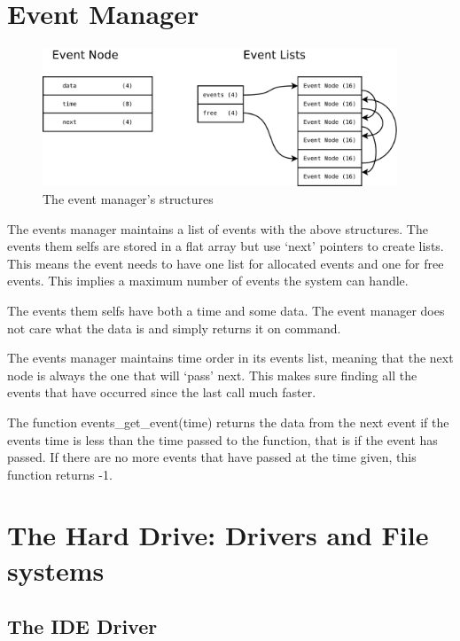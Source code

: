 \documentclass[a4paper]{report}
\begin{document}
\clearpage

\section{Event Manager}

\subsectoion


\begin{figure}[ht]
\centering
\includegraphics[width=400px]{images/Events_Structure}
\caption{The event manager's structures}
\label{fig:WinTitleBarScreen}
\end{figure}

The events manager maintains a list of events with the above structures. The events them selfs are stored in a flat array but use `next' pointers to create lists. This means the event needs to have one list for allocated events and one for free events. This implies a maximum number of events the system can handle.

The events them selfs have both a time and some data. The event manager does not care what the data is and simply returns it on command.

The events manager maintains time order in its events list, meaning that the next node is always the one that will `pass' next. This makes sure finding all the events that have occurred since the last call much faster.

The function events\_get\_event(time) returns the data from the next event if the events time is less than the time passed to the function, that is if the event has passed. If there are no more events that have passed at the time given, this function returns -1.








\clearpage

\section{The Hard Drive: Drivers and File systems}

\subsection{The IDE Driver}
\end{document}
